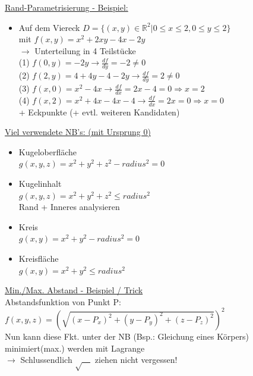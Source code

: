 \documentclass[6pt]{article}
\begin{document}
\begin{multicols*}{3}
	\columnbreak
	\underline{Rand-Parametrisierung - Beispiel:}
	\begin{itemize}[leftmargin=*,align=left]
			\item 	Auf dem Viereck $ D = \{(x,y) \in \mathbb{R}^2| 0 \leq x \leq 2, 0 \leq y \leq 2 \}$	\\
						mit $f(x,y) = x^2 + 2xy - 4x - 2y$\vspace{1mm}\\
						$\rightarrow$ Unterteilung in 4 Teilst{\"u}cke \\
						(1) $f(0,y) = -2y \rightarrow \frac{df}{dy}=-2 \not = 0$ \\
						(2) $f(2,y) = 4 + 4y -4 -2y \rightarrow \frac{df}{dy}=2 \not = 0$ \\
						(3) $f(x,0) = x^2 -4x \rightarrow \frac{df}{dx}=2x -4 = 0 \Rightarrow x=2$\\
						(4) $f(x,2) = x^2 + 4x - 4x -4 \rightarrow \frac{df}{dx}=2x = 0 \Rightarrow x= 0$\\
						+ Eckpunkte (+ evtl. weiteren Kandidaten)
	\end{itemize}
	
	\underline{Viel verwendete NB's: (mit Ursprung 0)}
	\begin{itemize}[ itemsep=2pt, parsep=2pt]
		\item 	Kugeloberfl{\"a}che   \\
					$g(x,y,z) = x^2 + y^2 + z^2 - radius^2 =0$  		
		\item 	Kugelinhalt \\
					$g(x,y,z) = x^2 + y^2 + z^2 \leq radius^2 $ \\
					Rand + Inneres analysieren
		\item 	Kreis \\
					$g(x,y) = x^2 + y^2 - radius^2 = 0$  
		\item 	Kreisfl{\"a}che \\
					$g(x,y) = x^2 + y^2 \leq radius^2$ 
	\end{itemize}
	
	\underline{Min./Max. Abstand - Beispiel / Trick} \vspace{1mm}\\
	Abstandsfunktion von Punkt P: \vspace{1mm}\\
	$f(x,y,z) = {\left(\sqrt{(x-P_x)^2 + (y-P_y)^2 + (z-P_z)^2}\right)}^2$ \vspace{2mm}\\
	Nun kann diese Fkt. unter der NB (Bsp.: Gleichung eines K{\"o}rpers) minimiert(max.) werden mit Lagrange \\
	$\rightarrow$ Schlussendlich $\sqrt{\quad}$ ziehen nicht vergessen!


\end{multicols*}
\end{document}
